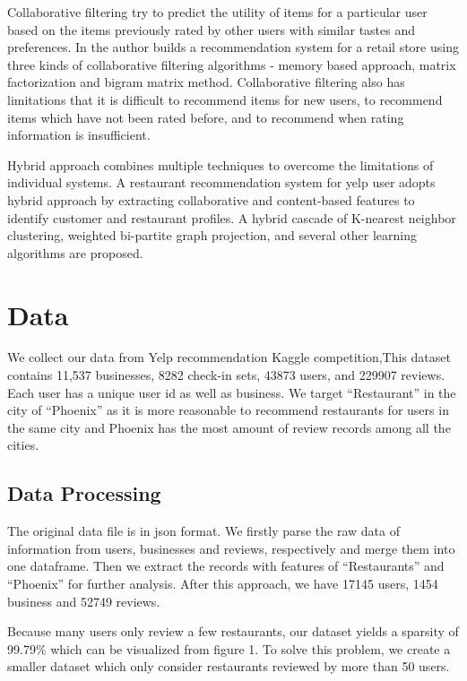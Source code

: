 \documentclass{llncs}
\begin{document}
Collaborative filtering try to predict the utility of items for a particular user based on the items previously rated by other users with similar tastes and preferences. In\cite{Bruno} the author builds a recommendation system for a retail store using three kinds of collaborative filtering algorithms - memory based approach, matrix factorization and bigram matrix method. Collaborative filtering also has limitations that it is difficult to recommend items for new users, to recommend items which have not been rated before, and to recommend when rating information is insufficient. 

Hybrid approach combines multiple techniques to overcome the limitations of individual systems. A restaurant recommendation system for yelp user\cite{Sumedh} adopts hybrid approach by extracting collaborative and content-based features to identify customer and restaurant profiles. A hybrid cascade of K-nearest neighbor clustering, weighted bi-partite graph projection, and several other learning algorithms are proposed. 

\section{Data}
We collect our data from Yelp recommendation Kaggle competition\cite{yelp},This dataset contains 11,537 businesses, 8282 check-in sets, 43873 users, and 229907 reviews. Each user has a unique user id as well as business. We target “Restaurant” in the city of “Phoenix” as it is more reasonable to recommend restaurants for users in the same city and Phoenix has the most amount of review records among all the cities.
\subsection{ Data Processing}
The original data file is in json format. We firstly parse the raw data of information from users, businesses and reviews, respectively and merge them into one dataframe. Then we extract the records with features of “Restaurants” and “Phoenix” for further analysis. After this approach, we have 17145 users, 1454 business and 52749 reviews.

Because many users only review a few restaurants, our dataset yields a sparsity of 99.79\% which can be visualized from figure 1. To solve this problem, we create a smaller dataset which only consider  restaurants reviewed by more than 50 users.
%
\end{document}
